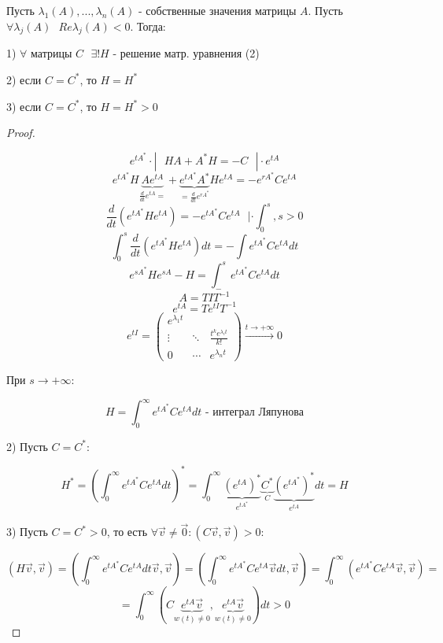 \documentclass[12pt, a4paper]{report}
\begin{document}
\begin{theorem}
    Пусть \( \lambda_1(A ) , ..., \lambda_n (A )  \) - собственные значения матрицы \( A \). Пусть \( \forall  \lambda_j (A ) \text{ } Re \lambda_j (A ) < 0  \). Тогда: 

    1) \( \forall   \) матрицы \(  C \text{ }  \exists ! H  \) - решение матр. уравнения (2)

    2) если \( C = C^*  \), то \( H = H^* \) 

    3) если \( C = C^*  \), то \( H =H^* > 0 \) 
\end{theorem}

\begin{proof} \(  \) 

    \[ e^{ t A ^* }  \cdot   | \text{ }  H A + A ^* H = -C \text{ }  | \cdot e^{tA }   \] 
    \[ e^{t A ^* }  H \underbrace{A e^{tA }}_{\frac{d}{dt }  e^{tA }= }  + \underbrace{e^{t A ^* }  A ^* }_{=\frac{d}{dt } e^{rA ^*}  }H e^{t A }  = - e^{r A ^* }   C e^{t A }  \] 
    \[ \frac{d}{dt } (e^{ t A^* } H e^{tA }   ) = -e^{t A^* } C e^{ tA }  \text{ } |\cdot \int_{0 }^{s} , s>0    \] 
    \[ \int_{0}^{s }  \frac{d}{dt } (e^{ t A^* } H e^{tA }   ) dt = - \int e^{t A^* } C e^{ tA } dt    \] 
    \[ e^{s A ^* }  H e^{ s A }  - H = \int_{- }^{s }  e^{t A ^* }  C e^{t A }  dt  \] 
    \[ A = T I T^{-1 }  \] 
    \[ e^{tA }  = T e^{ t I }  T^{-1 }  \] 
    \[ e^{t I }  = \begin{pmatrix}
    e^{\lambda_1 t }  &  & \\
    \vdots & \ddots & \frac{ t^ k e^{ \lambda_i t } }{ k!}  \\[10pt]
    0 & \cdots   & e^{ \lambda_n t } 
    \end{pmatrix}  \xrightarrow{t \to  + \infty  } 0   \] 

    При \( s \to  + \infty  \): 

    \[ H = \int_{0}^{\infty}  e^{ t A ^* }  C e^{tA }  d t \text{ - интеграл Ляпунова} \tag{3} \]
    
    2) Пусть \( C = C^* :  \) 

    \[ H^* = \left( \int_{0}^{\infty} e^{ t A ^* }  C e^{t A }  dt  \right) ^* = \int_{0 }^{\infty}\underbrace{     (e^{t A } )^*}_{e^{t A ^*} }\underbrace{ C ^* }_{C}\underbrace{ (e^{t A ^* } )^*}_{e^{tA } } dt = H\] 

    3) Пусть \( C = C^* > 0  \), то есть \(  \forall  \vec{v }  \neq  \vec{ 0}  : (C \vec{v } , \vec{v }         ) >0  \): 

    \[ (H \vec{ v }  ,\vec{ v }  ) = \left( \int_{0}^{\infty} e^{t A ^* }  C e^{tA }  dt \vec{v }  ,\vec{v }   \right) = \left( \int_{0}^{\infty} e^{tA^* }  C e^{tA } \vec{ v }  dt , \vec{ v }   \right) = \int_{0}^{\infty} (e^{tA ^* }  C e^{tA }  \vec{v } ,\vec{ v } ) = \] 
    \[ = \int_{0}^{\infty} ( C \underbrace{e^{tA }  \vec{v }}_{ w(t ) \neq  0 }   ,\underbrace{e^{tA }  \vec{ v }}_{w (t ) \neq  0}   ) dt > 0  \] 

\end{proof}
\end{document}
